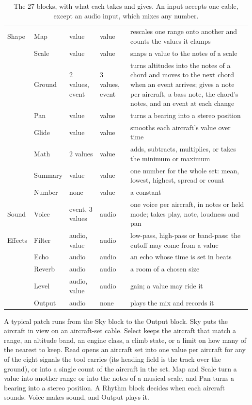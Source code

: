 \documentclass[11pt,letterpaper]{article}
\begin{document}
\begin{table}[tp]
\begin{tabular}{@{}L{1.4cm}L{1.9cm}L{2.2cm}L{2.5cm}L{6.6cm}@{}}
\midrule
Shape & Map & value & value & rescales one range onto another and counts the values it clamps\\
 & Scale & value & value & snaps a value to the notes of a scale\\
 & Ground & 2 values, event & 3 values, event & turns altitudes into the notes of a chord and moves to the next chord when an event arrives; gives a note per aircraft, a bass note, the chord's notes, and an event at each change\\
 & Pan & value & value & turns a bearing into a stereo position\\
 & Glide & value & value & smooths each aircraft's value over time\\
 & Math & 2 values & value & adds, subtracts, multiplies, or takes the minimum or maximum\\
 & Summary & value & value & one number for the whole set: mean, lowest, highest, spread or count\\
 & Number & none & value & a constant\\
\midrule
Sound & Voice & event, 3 values & audio & one voice per aircraft, in notes or held mode; takes play, note, loudness and pan\\
\midrule
Effects & Filter & audio, value & audio & low-pass, high-pass or band-pass; the cutoff may come from a value\\
 & Echo & audio & audio & an echo whose time is set in beats\\
 & Reverb & audio & audio & a room of a chosen size\\
 & Level & audio, value & audio & gain; a value may ride it\\
 & Output & audio & none & plays the mix and records it\\
\bottomrule
\end{tabular}
\caption{The 27 blocks, with what each takes and gives. An input accepts one cable, except an audio input, which mixes any number.}
\label{tab:blocks}
\end{table}

A typical patch runs from the Sky block to the Output block. Sky puts the aircraft in view on an aircraft-set cable. Select keeps the aircraft that match a range, an altitude band, an engine class, a climb state, or a limit on how many of the nearest to keep. Read opens an aircraft set into one value per aircraft for any of the eight signals the tool carries (its heading field is the track over the ground), or into a single count of the aircraft in the set. Map and Scale turn a value into another range or into the notes of a musical scale, and Pan turns a bearing into a stereo position. A Rhythm block decides when each aircraft sounds. Voice makes sound, and Output plays it.
\end{document}
